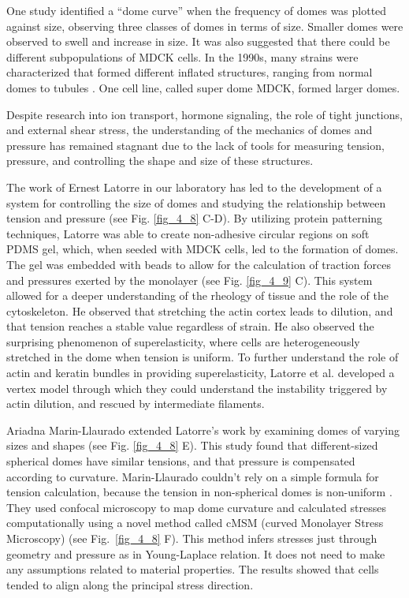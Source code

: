 One study \cite{popowicz1986} identified a ``dome curve'' when the frequency of domes was plotted against size, observing three classes of domes in terms of size. Smaller domes were observed to swell and increase in size. It was also suggested that there could be different subpopulations of MDCK cells. In the 1990s, many strains were characterized that formed different inflated structures, ranging from normal domes to tubules \cite{klebe1995}. One cell line, called super dome MDCK, formed larger domes.

Despite research into ion transport, hormone signaling, the role of tight junctions, and external shear stress, the understanding of the mechanics of domes and pressure has remained stagnant due to the lack of tools for measuring tension, pressure, and controlling the shape and size of these structures.

The work of Ernest Latorre in our laboratory has led to the development of a system for controlling the size of domes and studying the relationship between tension and pressure \cite{latorre2018} (see Fig. \ref{fig_4_8} C-D). By utilizing protein patterning techniques, Latorre was able to create non-adhesive circular regions on soft PDMS gel, which, when seeded with MDCK cells, led to the formation of domes. The gel was embedded with beads to allow for the calculation of traction forces and pressures exerted by the monolayer (see  Fig. \ref{fig_4_9} C). This system allowed for a deeper understanding of the rheology of tissue and the role of the cytoskeleton. He observed that stretching the actin cortex leads to dilution, and that tension reaches a stable value regardless of strain. He also observed the surprising phenomenon of superelasticity, where cells are heterogeneously stretched in the dome when tension is uniform. To further understand the role of actin and keratin bundles in providing superelasticity, Latorre et al. developed a vertex model through which they could understand the instability triggered by actin dilution, and rescued by intermediate filaments.

Ariadna Marin-Llaurado extended Latorre's work by examining domes of varying sizes and shapes (see Fig. \ref{fig_4_8} E). This study found that different-sized spherical domes have similar tensions, and that pressure is compensated according to curvature. Marin-Llaurado couldn't rely on a simple formula for tension calculation, because the tension in non-spherical domes is non-uniform \cite{marin-llaurado2022}. They used confocal microscopy to map dome curvature and calculated stresses computationally using a novel method called cMSM (curved Monolayer Stress Microscopy) (see Fig.~\ref{fig_4_8} F). This method infers stresses just through geometry and pressure as in Young-Laplace relation. It does not need to make any assumptions related to material properties. The results showed that cells tended to align along the principal stress direction.

